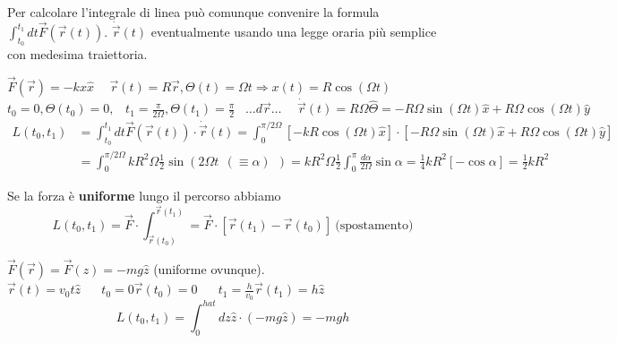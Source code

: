 \begin{observation}
    Per calcolare l'integrale di linea può comunque convenire la formula $\int_{t_0}^{t_1}dt \vec{F}(\vec{r}(t))$. 
    $\dot{\vec{r}}(t)$ eventualmente usando una legge oraria più semplice con medesima traiettoria.
\end{observation}
\begin{example}
    $\vec{F}(\vec{r}) = -kx\hat{x} \hspace{15pt}\vec{r}(t) = R\vec{r}, \Theta(t) = \Omega t \Rightarrow x(t) = R \cos(\Omega t)$\\
    $t_0 = 0, \Theta(t_0) = 0, \hspace{10pt}t_1 = \frac{\pi}{2\Omega}, \Theta(t_1) = \frac{\pi}{2} \hspace{10pt} \dots d\vec{r}\dots \hspace{15pt} \dot{\vec{r}}(t) = R\Omega\hat{\Theta} = -R\Omega\sin(\Omega t)\hat{x} + R\Omega \cos(\Omega t)\hat{y}$
    \begin{equation*}
        \begin{split}
            L(t_0, t_1) & = \int_{t_0}^{t_1}dt \vec{F}(\vec{r}(t)) \cdot \dot{\vec{r}}(t) = \int_{0}^{\pi/2\Omega}[-k R \cos(\Omega t)\hat{x}] \cdot [-R \Omega \sin(\Omega t) \hat{x} + R\Omega \cos(\Omega t)\hat{y}]\\
                        & = \int_{0}^{\pi/2\Omega}kR^2 \Omega \frac{1}{2}\sin(2\Omega t \:\: (\equiv \alpha) \:\:) = kR^2 \Omega \frac{1}{2}\int_{0}^{\pi} \frac{d\alpha}{2\Omega}\sin\alpha = \frac{1}{4} kR^2[-\cos\alpha] = \frac{1}{2}kR^2 
        \end{split}
    \end{equation*}
\end{example}
\hspace{-15pt}Se la forza è \textbf{uniforme} lungo il percorso abbiamo
$$L(t_0, t_1) = \vec{F} \cdot \int_{\vec{r}(t_0)}^{\vec{r}(t_1)} = \vec{F} \cdot [\vec{r}(t_1) - \vec{r}(t_0)] \:\text{(spostamento)}$$
\begin{example}
    $\vec{F}(\vec{r}) = \vec{F}(z) = -mg\hat{z}$ (uniforme ovunque).\\
    $\vec{r}(t) = v_0 t\hat{z} \hspace{20pt} t_0 = 0 \vec{r}(t_0) = 0 \hspace{20pt} t_1 = \frac{h}{v_0} \vec{r}(t_1) = h\hat{z} \hspace{20pt}$
    $$L(t_0, t_1) = \int_{0}^{hat}dz \hat{z} \cdot (-mg\hat{z}) = -mgh$$
\end{example}

